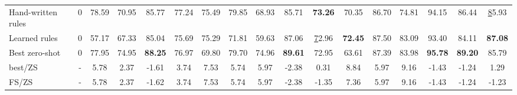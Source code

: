 \documentclass[sigconf,nonacm]{acmart}
\begin{document}
\begin{table*}[]
{\begin{tabular}{@{}l|c|ccccc|ccccc|ccccc@{}}
Hand-written rules                   & 0     & 78.59                       & 70.95                        & 85.77                        & 77.24                       & 75.49                       & 79.85                       & 68.93                        & 85.71                        & \textbf{73.26}               & 70.35                       & 86.70                       & 74.81                        & 94.15                        & 86.44                        & {\ul 85.93}                  \\
Learned rules                        & 0     & 57.17                       & 67.33                        & 85.04                        & 75.69                       & 75.29                       & 71.81                       & 59.63                        & 87.06                        & {\ul 72.96}                  & \textbf{72.45}              & 87.50                       & 83.09                        & 93.40                        & 84.11                        & \textbf{87.08}               \\ \midrule
Best zero-shot                       & 0     & 77.95                       & 74.95                        & \textbf{88.25}               & 76.97                       & 69.80                       & 79.70                       & 74.96                        & \textbf{89.61}               & 72.95                        & 63.61                       & 87.39                       & 83.98                        & \textbf{95.78}               & \textbf{89.20}               & 85.79                        \\ \midrule
 best/ZS                        & -     & {\color[HTML]{6434FC} 5.78} & {\color[HTML]{6434FC} 2.37}  & {\color[HTML]{FE0000} -1.61} & {\color[HTML]{6434FC} 3.74} & {\color[HTML]{6434FC} 7.53} & {\color[HTML]{6434FC} 5.74} & {\color[HTML]{6434FC} 5.97}  & {\color[HTML]{FE0000} -2.38} & {\color[HTML]{6434FC} 0.31}  & {\color[HTML]{6434FC} 8.84} & {\color[HTML]{6434FC} 5.97} & {\color[HTML]{6434FC} 9.16}  & {\color[HTML]{FE0000} -1.43} & {\color[HTML]{FE0000} -1.24} & {\color[HTML]{6434FC} 1.29}  \\
 FS/ZS                          & -     & {\color[HTML]{6434FC} 5.78} & {\color[HTML]{6434FC} 2.37}  & {\color[HTML]{FE0000} -1.62} & {\color[HTML]{6434FC} 3.74} & {\color[HTML]{6434FC} 7.53} & {\color[HTML]{6434FC} 5.74} & {\color[HTML]{6434FC} 5.97}  & {\color[HTML]{FE0000} -2.38} & {\color[HTML]{FE0000} -1.35} & {\color[HTML]{6434FC} 7.36} & {\color[HTML]{6434FC} 5.97} & {\color[HTML]{6434FC} 9.16}  & {\color[HTML]{FE0000} -1.43} & {\color[HTML]{FE0000} -1.24} & {\color[HTML]{FE0000} -1.23} \\

\end{tabular}}
\end{table*}
\end{document}

